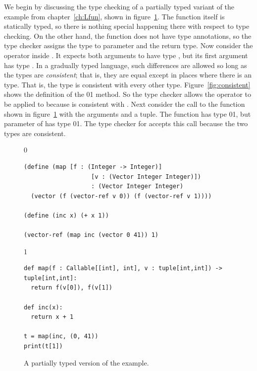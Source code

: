 \documentclass[7x10]{TimesAPriori_MIT}%
\def\racketEd{0}
\def\pythonEd{1}
\def\edition{1}
\newcommand{\racket}[1]{{\if\edition\racketEd{#1}\fi}}
\newcommand{\pythonColor}[0]{}
\newcommand{\python}[1]{{\if\edition\pythonEd\pythonColor #1\fi}}
\numberwithin{theorem}{chapter}
\numberwithin{definition}{chapter}
\numberwithin{equation}{chapter}
\begin{document}
We begin by discussing the type checking of a partially typed variant
of the  example from chapter~\ref{ch:Lfun}, shown in
figure~\ref{fig:gradual-map}.  The  function itself is
statically typed, so there is nothing special happening there with
respect to type checking. On the other hand, the  function
does not have type annotations, so the type checker assigns the type
\CANYTY{} to parameter  and the return type.  Now consider the
\code{+} operator inside . It expects both arguments to have
type \INTTY{}, but its first argument  has type \CANYTY{}.  In
a gradually typed language, such differences are allowed so long as
the types are \emph{consistent}; that is, they are equal except in
places where there is an \CANYTY{} type. That is, the type \CANYTY{}
is consistent with every other type.  Figure~\ref{fig:consistent}
shows the definition of the
\racket{}\python{} method.
%
So the type checker allows the \code{+} operator to be applied
to  because \CANYTY{} is consistent with \INTTY{}.
%
Next consider the call to the  function shown in
figure~\ref{fig:gradual-map} with the arguments  and a
tuple. The  function has type
\racket{}\python{},
but parameter  of  has type
\racket{}\python{}.
The type checker for \LangGrad{} accepts this call because the two types are
consistent.

\begin{figure}[hbtp]
  \begin{tcolorbox}[colback=white]
{\if\edition\racketEd
    \begin{lstlisting}
(define (map [f : (Integer -> Integer)]
                   [v : (Vector Integer Integer)])
                   : (Vector Integer Integer)
  (vector (f (vector-ref v 0)) (f (vector-ref v 1))))

(define (inc x) (+ x 1))

(vector-ref (map inc (vector 0 41)) 1)
    \end{lstlisting}
    \fi}
{\if\edition\pythonEd\pythonColor
\begin{lstlisting}
def map(f : Callable[[int], int], v : tuple[int,int]) -> tuple[int,int]:
  return f(v[0]), f(v[1])

def inc(x):
  return x + 1

t = map(inc, (0, 41))
print(t[1])
\end{lstlisting}
  \fi}
  \end{tcolorbox}

  \caption{A partially typed version of the  example.}
\label{fig:gradual-map}
\end{figure}
\end{document}
